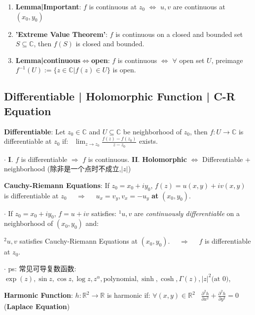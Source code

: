 \documentclass[9pt]{article}
\begin{document}
\begin{enumerate}[itemsep=-2pt, topsep=-2pt]
    \item \textbf{Lemma|Important}: $f$ is continuous at $z_0$ $\Leftrightarrow$ $u,v$ are continuous at $(x_0,y_0)$
    \item \textbf{'Extreme Value Theorem'}: $f$ is continuous on a closed and bounded set $S\subseteq\mathbb{C}$, then $f(S)$ is closed and bounded.
    \item \textbf{Lemma|continuous$\Leftrightarrow$open}: $f$ is continuous $\Leftrightarrow$ $\forall$ open set $U$, preimage $f^{-1}(U):=\{z\in\mathbb{C}|f(z)\in U\}$ is open.
\end{enumerate}


\subsection{Differentiable | Holomorphic Function | C-R Equation} %

\textbf{Differentiable}: Let $z_0\in\mathbb{C}$ and $U\subseteq\mathbb{C}$ be neighborhood of $z_0$, then $f:U\to\mathbb{C}$ is differentiable at $z_0$ if: \ $\lim_{z\to z_0}\frac{f(z)-f(z_0)}{z-z_0}$ exists.

$\cdot$ \textbf{I}. $f$ is differentiable $\Rightarrow$ $f$ is continuous. \quad \quad \textbf{II}. \textbf{Holomorphic} $\Leftrightarrow$ {\small Differentiable + neighborhood} {\tiny (除非是一个点时不成立,$|z|$)} 

\textbf{Cauchy-Riemann Equations}: If $z_0=x_0+iy_0$, $f(z)=u(x,y)+iv(x,y)$ is differentiable at $z_0$ \ \ $\Rightarrow$ \ \ $u_x=v_y,v_x=-u_y$ \textbf{at} $(x_0,y_0)$.

$\cdot$ If $z_0=x_0+iy_0$, $f=u+iv$ satisfies: $^1u,v$ are \textit{continuously differentiable} on a neighborhood of $(x_0,y_0)$ and:

\hspace{162pt} $^2u,v$ satisfies Cauchy-Riemann Equations at $(x_0,y_0)$. \ \ $\Rightarrow$ \ \ $f$ is differentiable at $z_0$.

$\cdot$ {\footnotesize ps: 常见可导复数函数: $\exp(z),\sin z,\cos z,\log z,z^\alpha,\text{polynomial},\sinh,\cosh,\Gamma(z),|z|^2\text{(at 0)}$,} \quad {}

\textbf{Harmonic Function}: $h:\mathbb{R}^2\to\mathbb{R}$ is harmonic if: $\forall(x,y)\in\mathbb{R}^2$ \ $\frac{\partial^2h}{\partial x^2}+\frac{\partial^2h}{\partial y^2}=0$ {\footnotesize (\textbf{Laplace Equation})}
\end{document}
